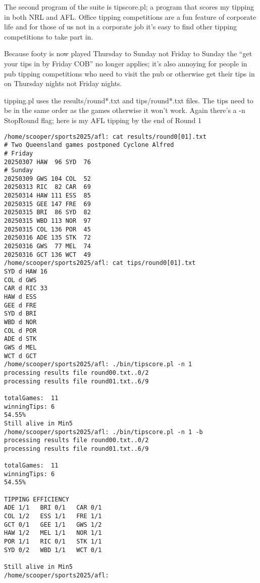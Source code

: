 \documentclass{article}      %
\begin{document}
The second program of the suite is tipscore.pl; a program that scores
my tipping in both NRL and AFL. Office tipping competitions are a fun
feature of corporate life and for those of us not in a corporate job
it's easy to find other tipping competitions to take part in.

Because footy is now played Thursday to Sunday not Friday to Sunday
the ``get your tips in by Friday COB'' no longer applies; it's also
annoying for people in pub tipping competitions who need to visit the
pub or otherwise get their tips in on Thursday nights not Friday
nights.

tipping.pl uses the results/round*.txt and tips/round*.txt files. The
tips need to be in the same order as the games otherwise it won't
work. Again there's a -n StopRound flag; here is my AFL tipping by the
end of Round 1

\begin{verbatim}
/home/scooper/sports2025/afl: cat results/round0[01].txt
# Two Queensland games postponed Cyclone Alfred
# Friday
20250307 HAW  96 SYD  76
# Sunday
20250309 GWS 104 COL  52
20250313 RIC  82 CAR  69
20250314 HAW 111 ESS  85
20250315 GEE 147 FRE  69
20250315 BRI  86 SYD  82
20250315 WBD 113 NOR  97
20250315 COL 136 POR  45
20250316 ADE 135 STK  72
20250316 GWS  77 MEL  74
20250316 GCT 136 WCT  49
/home/scooper/sports2025/afl: cat tips/round0[01].txt
SYD d HAW 16
COL d GWS
CAR d RIC 33
HAW d ESS
GEE d FRE
SYD d BRI
WBD d NOR
COL d POR
ADE d STK
GWS d MEL
WCT d GCT
/home/scooper/sports2025/afl: ./bin/tipscore.pl -n 1
processing results file round00.txt..0/2
processing results file round01.txt..6/9

totalGames:  11
winningTips: 6
54.55%
Still alive in Min5
/home/scooper/sports2025/afl: ./bin/tipscore.pl -n 1 -b
processing results file round00.txt..0/2
processing results file round01.txt..6/9

totalGames:  11
winningTips: 6
54.55%

TIPPING EFFICIENCY
ADE 1/1   BRI 0/1   CAR 0/1
COL 1/2   ESS 1/1   FRE 1/1
GCT 0/1   GEE 1/1   GWS 1/2
HAW 1/2   MEL 1/1   NOR 1/1
POR 1/1   RIC 0/1   STK 1/1
SYD 0/2   WBD 1/1   WCT 0/1

Still alive in Min5
/home/scooper/sports2025/afl:
\end{verbatim}
\end{document}

